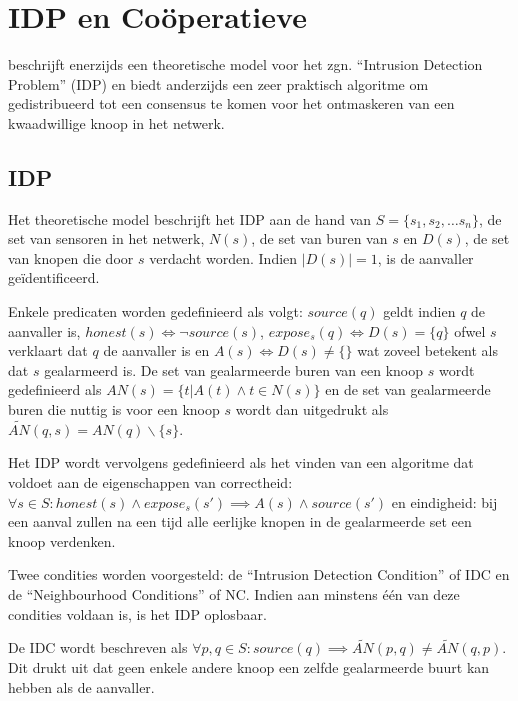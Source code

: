 
\chapter{IDP en Co\"operatieve }
\label{appendix:idp-cooperation}

\citep{krontiris2009cooperative} beschrijft enerzijds een theoretische model
voor het zgn. ``Intrusion Detection Problem'' (IDP) en biedt anderzijds een
zeer praktisch algoritme om gedistribueerd tot een consensus te komen voor het
ontmaskeren van een kwaadwillige knoop in het netwerk.

\section{IDP}
\label{section:idp}

Het theoretische model beschrijft het IDP aan de hand van $S = \{ s_1, s_2,
\dots s_n \}$, de set van sensoren in het netwerk, $N(s)$, de set van buren van
$s$ en $D(s)$, de set van knopen die door $s$ verdacht worden. Indien $|D(s)| =
1$, is de aanvaller ge\"identificeerd.

Enkele predicaten worden gedefinieerd als volgt: $source(q)$ geldt indien $q$
de aanvaller is, $honest(s) \iff \neg source(s)$, $expose_s(q) \iff D(s) = \{ q
\}$ ofwel $s$ verklaart dat $q$ de aanvaller is en $A(s) \iff D(s) \not= \{\}$
wat zoveel betekent als dat $s$ gealarmeerd is. De set van gealarmeerde buren
van een knoop $s$ wordt gedefinieerd als $AN(s) = \{ t | A(t) \wedge t \in N(s)
\}$ en de set van gealarmeerde buren die nuttig is voor een knoop $s$ wordt dan
uitgedrukt als $\tilde{AN}(q,s) = AN(q) \backslash \{s\}$.

Het IDP wordt vervolgens gedefinieerd als het vinden van een algoritme dat
voldoet aan de eigenschappen van correctheid: $\forall s \in S : honest(s)
\wedge expose_s(s') \implies A(s) \wedge source(s')$ en eindigheid: bij een
aanval zullen na een tijd alle eerlijke knopen in de gealarmeerde set een knoop
verdenken.

Twee condities worden voorgesteld: de ``Intrusion Detection Condition'' of IDC
en de ``Neighbourhood Conditions'' of NC. Indien aan minstens \'e\'en van deze
condities voldaan is, is het IDP oplosbaar.

De IDC wordt beschreven als $\forall p,q \in S : source(q) \implies
\tilde{AN}(p,q) \not= \tilde{AN}(q,p)$. Dit drukt uit dat geen enkele andere
knoop een zelfde gealarmeerde buurt kan hebben als de aanvaller.

